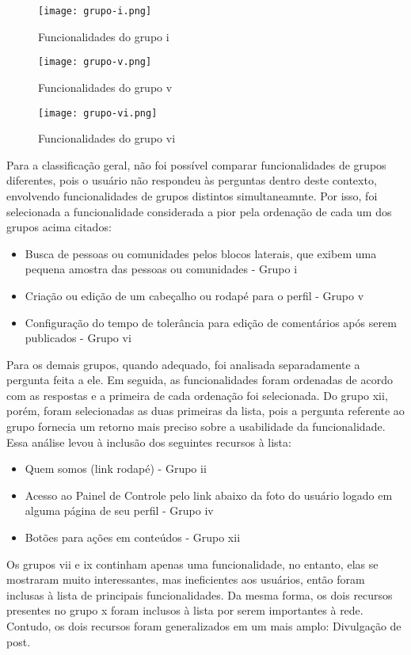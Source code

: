 \begin{figure}[!h]
  \centering
  \texttt{[image: grupo-i.png]} 
  \caption{Funcionalidades do grupo i}
  \label{fig:grupo-i} 
\end{figure}

    
\begin{figure}[!h]
  \centering
  \texttt{[image: grupo-v.png]} 
  \caption{Funcionalidades do grupo v}
  \label{fig:grupo-v} 
\end{figure}

    
\begin{figure}[!h]
  \centering
  \texttt{[image: grupo-vi.png]} 
  \caption{Funcionalidades do grupo vi}
  \label{fig:grupo-vi} 
\end{figure}


    Para a classificação geral, não foi possível comparar funcionalidades de grupos diferentes, pois o usuário não respondeu às perguntas dentro deste contexto, envolvendo funcionalidades de grupos distintos simultaneamnte. Por isso, foi selecionada a funcionalidade considerada a pior pela ordenação de cada um dos grupos acima citados: 
    \begin{itemize}
    \item Busca de pessoas ou comunidades pelos blocos laterais, que exibem uma pequena amostra das pessoas ou comunidades - Grupo i
    \item Criação ou edição de um cabeçalho ou rodapé para o perfil - Grupo v
    \item Configuração do tempo de tolerância para edição de comentários após serem publicados - Grupo vi
    \end{itemize}
    Para os demais grupos, quando adequado, foi analisada separadamente a pergunta feita a ele. Em seguida, as funcionalidades foram ordenadas de acordo com as respostas e a primeira de cada ordenação foi selecionada. Do grupo xii, porém, foram selecionadas as duas primeiras da lista, pois a pergunta referente ao grupo fornecia um retorno mais preciso sobre a usabilidade da funcionalidade. Essa análise levou à inclusão dos seguintes recursos à lista:
    \begin{itemize}
    \item Quem somos (link rodapé) - Grupo ii
    \item Acesso ao Painel de Controle pelo link abaixo da foto do usuário logado em alguma página de seu perfil - Grupo iv
    \item Botões para ações em conteúdos - Grupo xii
    \end{itemize}
    Os grupos vii e ix continham apenas uma funcionalidade, no entanto, elas se mostraram muito interessantes, mas ineficientes aos usuários, então foram inclusas à lista de principais funcionalidades. Da mesma forma, os dois recursos presentes no grupo x foram inclusos à lista por serem importantes à rede. Contudo, os dois recursos foram generalizados em um mais amplo: Divulgação de post. 
    
